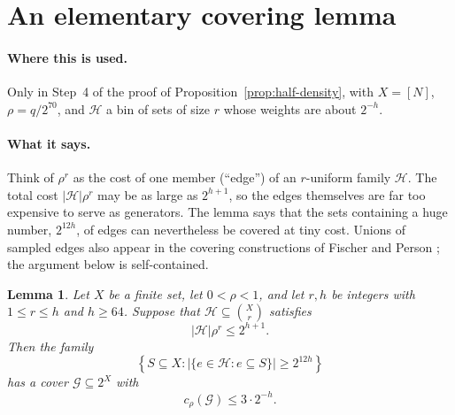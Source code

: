 \documentclass[11pt,letterpaper]{article}
\newtheorem{lemma}[theorem]{Lemma}
\theoremstyle{definition}
\theoremstyle{remark}
\numberwithin{equation}{section}
\begin{document}
\section{An elementary covering lemma}
\label{sec:covering}

\paragraph{Where this is used.}
Only in Step~4 of the proof of Proposition~\ref{prop:half-density}, with
$X=[N]$, $\rho=q/2^{70}$, and $\mathcal H$ a bin of sets of size $r$ whose
weights are about $2^{-h}$.

\paragraph{What it says.}
Think of $\rho^r$ as the cost of one member (``edge'') of an $r$-uniform
family $\mathcal H$. The total cost $|\mathcal H|\rho^r$ may be as large as
$2^{h+1}$, so the edges themselves are far too expensive to serve as
generators. The lemma says that the sets containing a huge number,
$2^{12h}$, of edges can nevertheless be covered at tiny cost.
Unions of sampled edges also appear in the covering constructions of
Fischer and Person \cite[Sections~1.1 and~2]{FischerPerson25}; the argument
below is self-contained.

\begin{lemma}\label{lem:covering}
Let \(X\) be a finite set, let \(0<\rho<1\), and let \(r,h\) be integers
with \(1\le r\le h\) and \(h\ge64\). Suppose that
\(\mathcal H\subseteq\binom{X}{r}\) satisfies
\[
|\mathcal H|\rho^r\le2^{h+1}.
\]
Then the family
\[
\left\{S\subseteq X:
  |\{e\in\mathcal H:e\subseteq S\}|\ge2^{12h}\right\}
\]
has a cover \(\mathcal G\subseteq2^X\) with
\[
c_\rho(\mathcal G)\le3\cdot2^{-h}.
\]
\end{lemma}
\end{document}
